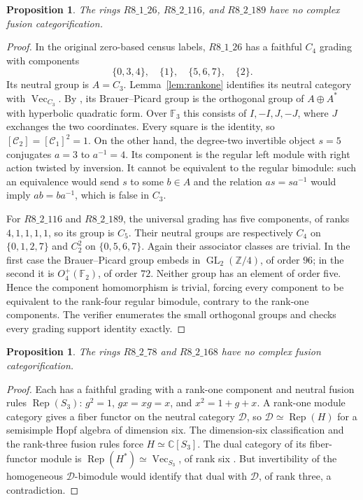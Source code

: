 \documentclass[11pt,reqno]{amsart}
\newtheorem{proposition}[theorem]{Proposition}
\theoremstyle{definition}
\theoremstyle{remark}
\newcommand{\C}{\mathbb C}
\newcommand{\Z}{\mathbb Z}
\newcommand{\Rep}{\operatorname{Rep}}
\renewcommand{\Vec}{\operatorname{Vec}}
\begin{document}
\begin{proposition}\label{prop:graded}
The rings $R8\_1\_26$, $R8\_2\_116$, and $R8\_2\_189$ have no complex fusion categorification.
\end{proposition}
\begin{proof}
In the original zero-based census labels, $R8\_1\_26$ has a faithful $C_4$ grading with components
\[
\{0,3,4\},\quad\{1\},\quad\{5,6,7\},\quad\{2\}.
\]
Its neutral group is $A=C_3$. Lemma~\ref{lem:rankone} identifies its neutral category with $\Vec_{C_3}$. By \cite[Corollary~1.2]{ENOExt}, its Brauer--Picard group is the orthogonal group of $A\oplus A^*$ with hyperbolic quadratic form. Over $\mathbb F_3$ this consists of $I,-I,J,-J$, where $J$ exchanges the two coordinates. Every square is the identity, so $[\mathcal C_2]=[\mathcal C_1]^2=1$.
On the other hand, the degree-two invertible object $s=5$ conjugates $a=3$ to $a^{-1}=4$. Its component is the regular left module with right action twisted by inversion. It cannot be equivalent to the regular bimodule: such an equivalence would send $s$ to some $b\in A$ and the relation $as=sa^{-1}$ would imply $ab=ba^{-1}$, which is false in $C_3$.

For $R8\_2\_116$ and $R8\_2\_189$, the universal grading has five components, of ranks $4,1,1,1,1$, so its group is $C_5$. Their neutral groups are respectively $C_4$ on $\{0,1,2,7\}$ and $C_2^2$ on $\{0,5,6,7\}$. Again their associator classes are trivial. In the first case the Brauer--Picard group embeds in $\operatorname{GL}_2(\Z/4)$, of order $96$; in the second it is $O_4^+(\mathbb F_2)$, of order $72$. Neither group has an element of order five. Hence the component homomorphism is trivial, forcing every component to be equivalent to the rank-four regular bimodule, contrary to the rank-one components. The verifier enumerates the small orthogonal groups and checks every grading support identity exactly.
\end{proof}

\begin{proposition}\label{prop:hopf6}
The rings $R8\_2\_78$ and $R8\_2\_168$ have no complex fusion categorification.
\end{proposition}
\begin{proof}
Each has a faithful grading with a rank-one component and neutral fusion rules $\Rep(S_3)$: $g^2=1$, $gx=xg=x$, and $x^2=1+g+x$. A rank-one module category gives a fiber functor on the neutral category $\mathcal D$, so $\mathcal D\simeq\Rep(H)$ for a semisimple Hopf algebra of dimension six. The dimension-six classification \cite{HopfPQ} and the rank-three fusion rules force $H\simeq\C[S_3]$. The dual category of its fiber-functor module is $\Rep(H^*)\simeq\Vec_{S_3}$, of rank six \cite[Example~7.12.26]{EGNO}. But invertibility of the homogeneous $\mathcal D$-bimodule would identify that dual with $\mathcal D$, of rank three, a contradiction.
\end{proof}
\end{document}
